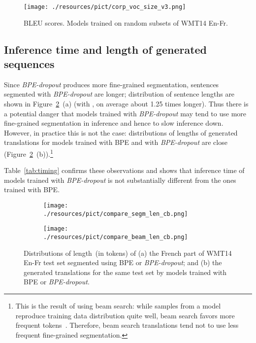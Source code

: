 \documentclass[11pt,a4paper]{article}
\begin{document}
\label{sect:corpora_voc_size}
\begin{figure}[t!]
    \centering
    \texttt{[image: ./resources/pict/corp\_voc\_size\_v3.png]}
    \caption{BLEU scores. Models trained on random subsets of WMT14 En-Fr.}
    \label{fig:corpora_size}
\end{figure}

\subsection{Inference time and length of generated sequences}
\label{sect:inference_time}


Since \textit{BPE-dropout} produces more fine-grained segmentation, sentences segmented with \textit{BPE-dropout} are longer; distribution of sentence lengths are shown in Figure~\ref{fig:output_length}~(a) (with ,  on average about 1{.}25 times longer). Thus there is a potential danger that models trained with \textit{BPE-dropout} may tend to use more fine-grained segmentation in inference and hence to slow inference down. However, in practice this is not the case: distributions of lengths of generated translations for models trained with BPE and with \textit{BPE-dropout} are close (Figure~\ref{fig:output_length}~(b)).\footnote{This is the result of using beam search: while samples from a model reproduce training data distribution quite well, beam search favors more frequent tokens~\cite{ott2018analyzing}. Therefore, beam search translations tend not to use less frequent fine-grained segmentation.}


Table~\ref{tab:timing} confirms these observations and shows that inference time of models trained with \textit{BPE-dropout} is not substantially different from the ones trained with BPE. 


\begin{figure}[t!]
    \centering
    \begin{subfigure}[b]{0.23\textwidth}
        \texttt{[image: ./resources/pict/compare\_segm\_len\_cb.png]}
        \caption{}
    \end{subfigure}
    \begin{subfigure}[b]{0.23\textwidth}
       \texttt{[image: ./resources/pict/compare\_beam\_len\_cb.png]}
        \caption{}
    \end{subfigure}
    \caption{Distributions of length~(in tokens) of (a) the French part of WMT14 En-Fr test set segmented using BPE or  \textit{BPE-dropout}; and (b) the generated translations for the same test set by models trained with BPE or \textit{BPE-dropout}.}
    \label{fig:output_length}
\end{figure}
\end{document}
